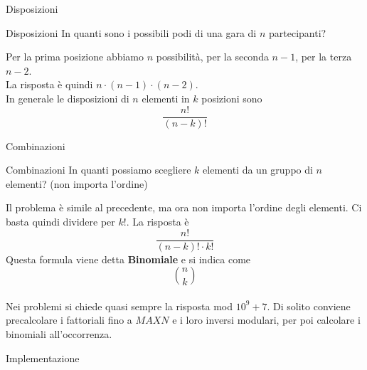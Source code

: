 \documentclass[compress]{beamer}
\begin{document}
\begin{frame}{Disposizioni}
    \begin{exampleblock}{Disposizioni}
        In quanti sono i possibili podi di una gara di $n$ partecipanti?
    \end{exampleblock}
    \vfill
    \pause
    Per la prima posizione abbiamo $n$ possibilit\`a, per la seconda $n-1$, per la terza $n-2$.\\
    \vfill
    \pause
    La risposta \`e quindi $n \cdot (n-1) \cdot (n-2)$.\\
    \vfill
    \pause
    In generale le disposizioni di $n$ elementi in $k$ posizioni sono \[\frac{n!}{(n-k)!}\]
\end{frame}

\begin{frame}{Combinazioni}
    \begin{exampleblock}{Combinazioni}
        In quanti possiamo scegliere $k$ elementi da un gruppo di $n$ elementi? (non importa l'ordine)
    \end{exampleblock}
    \pause
    Il problema \`e simile al precedente, ma ora non importa l'ordine degli elementi.
    Ci basta quindi dividere per $k!$.
    \pause
    La risposta \`e \[\frac{n!}{(n-k)! \cdot k!}\]
    \pause
Questa formula viene detta \textbf{Binomiale} e si indica come \[\binom{n}{k}\] \\
    \pause
    Nei problemi si chiede quasi sempre la risposta mod $10^9 + 7$. Di solito conviene precalcolare i fattoriali fino a $MAXN$ e i loro inversi modulari, per poi calcolare i binomiali all'occorrenza. 
\end{frame}

\begin{frame}{Implementazione}
\end{frame}
\end{document}
